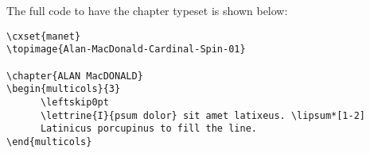 The full code to have the chapter typeset is shown below:


\begin{lstlisting}
\cxset{manet}
\topimage{Alan-MacDonald-Cardinal-Spin-01}

\chapter{ALAN MacDONALD}
\begin{multicols}{3}
      \leftskip0pt
      \lettrine{I}{psum dolor} sit amet latixeus. \lipsum*[1-2]
      Latinicus porcupinus to fill the line.
\end{multicols}
\end{lstlisting}
\lipsum[2]



